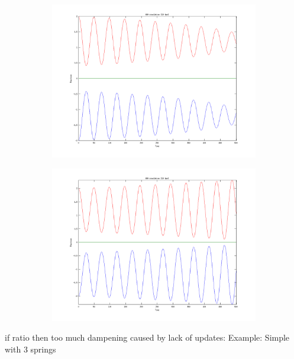 \documentclass[11pt]{article}
\begin{document}
\begin{figure}[H]
    \begin{subfigure}{0.5\textwidth}
        \includegraphics[width=\textwidth]{../images/atomic_uniform_10fps_0.png}
        \caption{}
        \label{fig:atomic_uniform_10fps_0}
    \end{subfigure}
    \begin{subfigure}{0.5\textwidth}
        \includegraphics[width=\textwidth]{../images/atomic_uniform_10fps_1.png}
        \caption{}
        \label{fig:atomic_uniform_10fps_1}
    \end{subfigure}
\end{figure}


if ratio then too much dampening caused by lack of updates: Example: Simple with
3 springs
\end{document}
